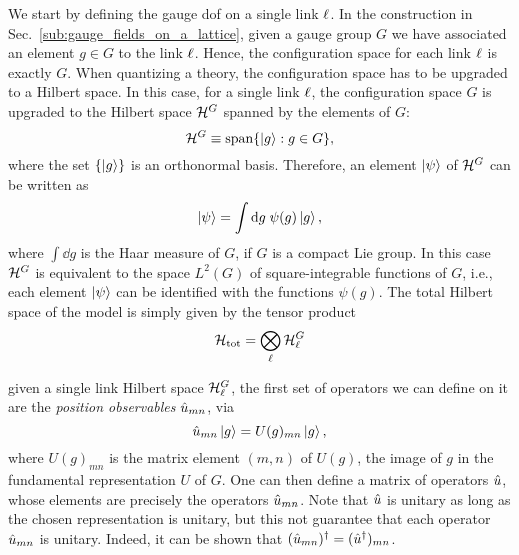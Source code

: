 We start by defining the gauge \ac{dof} on a single link $\ell$.
In the construction in Sec.~\ref{sub:gauge_fields_on_a_lattice}, given a gauge group $G$ we have associated an element $g \in G$ to the link $\ell$.
Hence, the configuration space for each link $\ell$ is exactly $G$.
When quantizing a theory, the configuration space has to be upgraded to a Hilbert space.
In this case, for a single link $\ell$, the configuration space $G$ is upgraded to the Hilbert space $\mathcal{H}^{G}$ spanned by the elements of $G$:
\begin{equation}
    \mathcal{H}^G \equiv \text{span}\{\ket{g} : g \in G\},
    \label{eq:single_link_Hilbert_space}
\end{equation}
where the set $\{\ket{g}\}$ is an orthonormal basis.
Therefore, an element $\ket{\psi}$ of $\mathcal{H}^G$ can be written as
\begin{equation}
    \ket{\psi} = \int \dd g \; \psi(g) \ket{g},
\end{equation}
where $\int \dd g$ is the Haar measure of $G$, if $G$ is a compact Lie group.
In this case $\mathcal{H}^{G}$ is equivalent to the space $L^2(G)$ of square-integrable functions of $G$, i.e., each element $\ket{\psi}$ can be identified with the functions $\psi(g)$.
The total Hilbert space of the model is simply given by the tensor product
\begin{equation}
    \mathcal{H}_{\text{tot}} = \bigotimes_{\ell} \mathcal{H}^G_{\ell}
    \label{eq:total_Hilbert_space}
\end{equation}


given a single link Hilbert space $\mathcal{H}^G_{\ell}$, the first set of operators we can define on it are the \emph{position observables} $\hat{u}_{mn}$, via
\begin{equation}
    \hat{u}_{mn} \ket{g} = U(g)_{mn} \ket{g},
\end{equation}
where $U(g)_{mn}$ is the matrix element $(m, n)$ of $U(g)$, the image of $g$ in the fundamental representation $U$ of $G$.
One can then define a matrix of operators $\hat{u}$, whose elements are precisely the operators $\hat{u}_{mn}$.
Note that $\hat{u}$ is unitary as long as the chosen representation is unitary, but this not guarantee that each operator $\hat{u}_{mn}$ is unitary.
Indeed, it can be shown that $(\hat{u}_{mn})^{\dagger} = (\hat{u}^{\dagger})_{mn}$.

